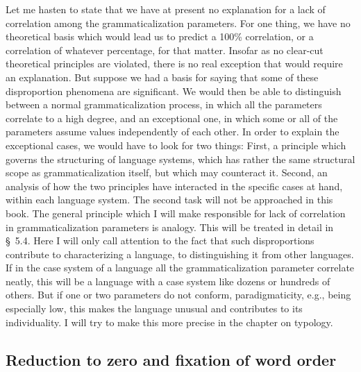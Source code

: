 Let me hasten to state that we have at present no explanation for a lack of correlation among the grammaticalization parameters. For one thing, we have no theoretical basis which would lead us to predict a 100\% correlation, or a correlation of whatever percentage, for that matter. Insofar as no clear-cut theoretical principles are violated, there is no real exception that would require an explanation. But suppose we had a basis for saying that some of these disproportion phenomena are significant. We would then be able to distinguish between a normal grammaticalization process, in which all the parameters correlate to a high degree, and an exceptional one, in which some or all of the parameters assume values independently of each other. In order to explain the exceptional cases, we would have to look for two things: First, a principle which governs the structuring of language systems, which has rather the same structural scope as grammaticalization itself, but which may counteract it. Second, an analysis of how the two principles have interacted in the specific cases at hand, within each language system. The second task will not be approached in this book. The general principle which I will make responsible for lack of correlation in grammaticalization parameters is analogy. This will be treated in detail in §~5.4. Here I will only call attention to the fact that such disproportions contribute to characterizing a language, to distinguishing it from other languages. If in the case system of a language all the grammaticalization parameter correlate neatly, this will be a language with a case system like dozens or hundreds of others. But if one or two parameters do not conform, paradigmaticity, e.g., being especially low, this makes the language unusual and contributes to its individuality. I will try to make this more precise in the chapter on typology.

\subsection{Reduction to zero and fixation of word order} \label{sec:4.4.4}

